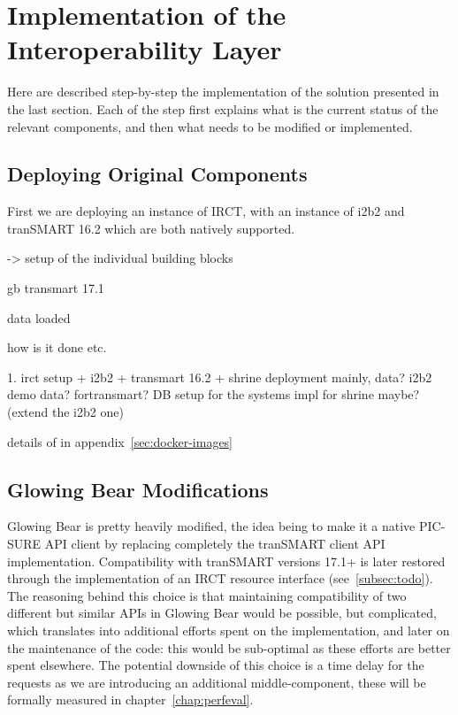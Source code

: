 \section{Implementation of the Interoperability Layer}
Here are described step-by-step the implementation of the solution presented in the last section. 
Each of the step first explains what is the current status of the relevant components, and then what needs to be modified or implemented.

\subsection{Deploying Original Components}
First we are deploying an instance of IRCT, with an instance of i2b2 and tranSMART 16.2 which are both natively supported. 

-> setup of the individual building blocks

gb
transmart 17.1

data loaded

how is it done etc.

1. irct setup + i2b2 + transmart 16.2 + shrine
deployment mainly, data? i2b2 demo data? fortransmart? 
DB setup for the systems
impl for shrine maybe? (extend the i2b2 one)

details of in appendix~\ref{sec:docker-images}


\subsection{Glowing Bear Modifications}

Glowing Bear is pretty heavily modified, the idea being to make it a native PIC-SURE API client by replacing completely the tranSMART client API implementation. 
Compatibility with tranSMART versions 17.1+ is later restored through the implementation of an IRCT resource interface (see~\ref{subsec:todo}).
The reasoning behind this choice is that maintaining compatibility of two different but similar APIs in Glowing Bear would be possible, but complicated, which translates into additional efforts spent on the implementation, and later on the maintenance of the code: this would be sub-optimal as these efforts are better spent elsewhere.
The potential downside of this choice is a time delay for the requests as we are introducing an additional middle-component, these will be formally measured in chapter~\ref{chap:perfeval}.

